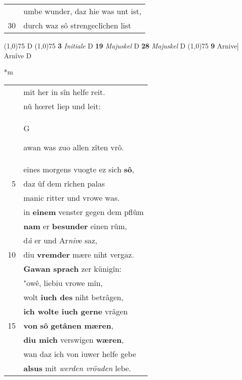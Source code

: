 \documentclass[8pt,a4paper,notitlepage]{article}
\begin{document}
\begin{table}[ht]
\begin{minipage}[t]{0.5\linewidth}
\begin{tabular}{rl}
 & umbe wunder, daz hie was unt ist,\\ 
30 & durch waz sô strengeclîchen list\\ 
\end{tabular}
\scriptsize
\line(1,0){75} \newline
D \newline
\line(1,0){75} \newline
\textbf{3} \textit{Initiale} D  \textbf{19} \textit{Majuskel} D  \textbf{28} \textit{Majuskel} D  \newline
\line(1,0){75} \newline
\textbf{9} Arnive] Arnîve D \newline
\end{minipage}
\hspace{0.5cm}
\begin{minipage}[t]{0.5\linewidth}
\small
\begin{center}*m
\end{center}
\begin{tabular}{rl}
 & mit her in sîn helfe reit.\\ 
 & nû hœret liep und leit:\\ 
 & \begin{large}G\end{large}awan was zuo allen zîten vrô.\\ 
 & eines morgens vuogte ez sich \textbf{sô},\\ 
5 & daz ûf dem rîchen palas\\ 
 & manic ritter und vrowe was.\\ 
 & in \textbf{einem} venster gegen dem pflûm\\ 
 & \textbf{nam} er \textbf{besunder} einen rûm,\\ 
 & d\textit{â} er und Ar\textit{niv}e saz,\\ 
10 & diu \textbf{vremder} mære niht vergaz.\\ 
 & \textbf{Gawan sprach} zer künigîn:\\ 
 & "owê, liebiu vrowe mîn,\\ 
 & wolt \textbf{iuch des} niht betrâgen,\\ 
 & \textbf{ich wolte iuch gerne} vrâgen\\ 
15 & \textbf{von} \textbf{sô} \textbf{getânen mæren},\\ 
 & \textbf{diu mich} verswigen \textbf{wæren},\\ 
 & wan daz ich von iuwer helfe gebe\\ 
 & \textbf{alsus} mit \textit{werden vröuden} lebe.\\ 

\end{tabular}
\end{minipage}
\end{table}
\end{document}
